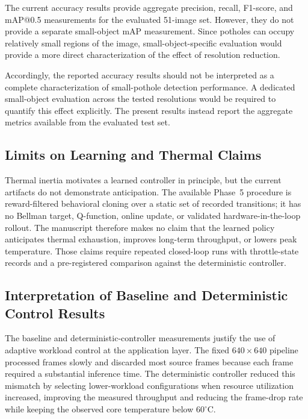 \documentclass{ieeeaccess}
\begin{document}
The current accuracy results provide aggregate precision, recall, F1-score,
and mAP@0.5 measurements for the evaluated 51-image set. However, they do
not provide a separate small-object mAP measurement. Since potholes can
occupy relatively small regions of the image, small-object-specific
evaluation would provide a more direct characterization of the effect of
resolution reduction.

Accordingly, the reported accuracy results should not be interpreted as a
complete characterization of small-pothole detection performance. A
dedicated small-object evaluation across the tested resolutions would be
required to quantify this effect explicitly. The present results instead
report the aggregate metrics available from the evaluated test set.

\subsection{Limits on Learning and Thermal Claims}
\begin{highlight}
Thermal inertia motivates a learned controller in principle, but the current
artifacts do not demonstrate anticipation. The available Phase~5 procedure is
reward-filtered behavioral cloning over a static set of recorded transitions;
it has no Bellman target, Q-function, online update, or validated
hardware-in-the-loop rollout. The manuscript therefore makes no claim that
the learned policy anticipates thermal exhaustion, improves long-term
throughput, or lowers peak temperature. Those claims require repeated
closed-loop runs with throttle-state records and a pre-registered comparison
against the deterministic controller.
\end{highlight}

\subsection{Interpretation of Baseline and Deterministic Control Results}

The baseline and deterministic-controller measurements justify the use of
adaptive workload control at the application layer. The fixed $640 \times 640$
pipeline processed frames slowly and discarded most source frames because each
frame required a substantial inference time. The deterministic controller
reduced this mismatch by selecting lower-workload configurations when resource
utilization increased, improving the measured throughput and reducing the
frame-drop rate while keeping the observed core temperature below $60^\circ$C.
\end{document}
